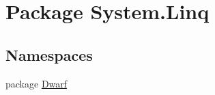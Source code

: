 \hypertarget{namespace_system_1_1_linq}{\section{Package System.\+Linq}
\label{namespace_system_1_1_linq}
}
\subsection*{Namespaces}
\begin{DoxyCompactItemize}
\item 
package \hyperlink{namespace_system_1_1_linq_1_1_dwarf}{Dwarf}
\end{DoxyCompactItemize}
